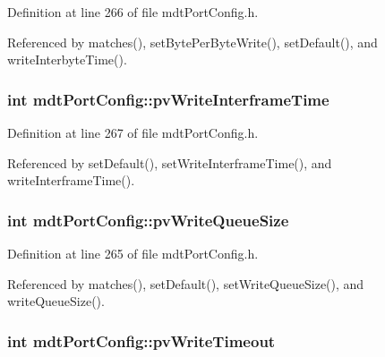 Definition at line 266 of file mdt\-Port\-Config.\-h.



Referenced by matches(), set\-Byte\-Per\-Byte\-Write(), set\-Default(), and write\-Interbyte\-Time().

\hypertarget{classmdt_port_config_ace2001b084ab2611c2de56c951974457}{
\subsubsection[{pv\-Write\-Interframe\-Time}]{\setlength{\rightskip}{0pt plus 5cm}int mdt\-Port\-Config\-::pv\-Write\-Interframe\-Time\hspace{0.3cm}{\ttfamily [protected]}}}\label{classmdt_port_config_ace2001b084ab2611c2de56c951974457}


Definition at line 267 of file mdt\-Port\-Config.\-h.



Referenced by set\-Default(), set\-Write\-Interframe\-Time(), and write\-Interframe\-Time().

\hypertarget{classmdt_port_config_a547f27521b405528f86259fa9aaa37c5}{
\subsubsection[{pv\-Write\-Queue\-Size}]{\setlength{\rightskip}{0pt plus 5cm}int mdt\-Port\-Config\-::pv\-Write\-Queue\-Size\hspace{0.3cm}{\ttfamily [protected]}}}\label{classmdt_port_config_a547f27521b405528f86259fa9aaa37c5}


Definition at line 265 of file mdt\-Port\-Config.\-h.



Referenced by matches(), set\-Default(), set\-Write\-Queue\-Size(), and write\-Queue\-Size().

\hypertarget{classmdt_port_config_ad840fd68971a9ccc6092ce2aa3167591}{
\subsubsection[{pv\-Write\-Timeout}]{\setlength{\rightskip}{0pt plus 5cm}int mdt\-Port\-Config\-::pv\-Write\-Timeout\hspace{0.3cm}{\ttfamily [protected]}}}\label{classmdt_port_config_ad840fd68971a9ccc6092ce2aa3167591}


